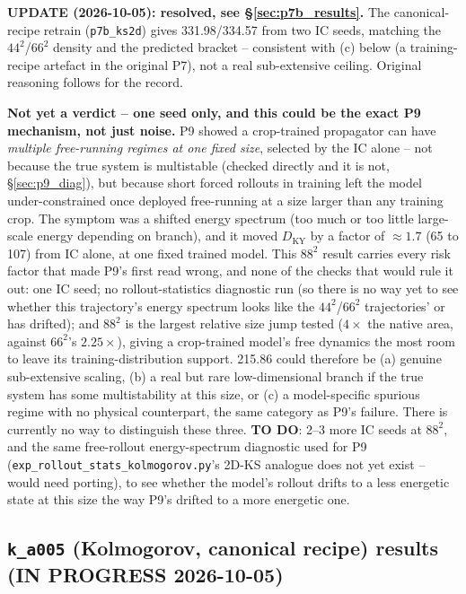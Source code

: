 \documentclass[11pt]{article}
\begin{document}
\textbf{UPDATE (2026-10-05): resolved, see \S\ref{sec:p7b_results}.} The
canonical-recipe retrain (\texttt{p7b\_ks2d}) gives 331.98/334.57 from
two IC seeds, matching the $44^2$/$66^2$ density and the predicted
bracket -- consistent with (c) below (a training-recipe artefact in the
original P7), not a real sub-extensive ceiling. Original reasoning
follows for the record.

\textbf{Not yet a verdict -- one seed only, and this could be the exact
P9 mechanism, not just noise.} P9 showed a crop-trained propagator can
have \emph{multiple free-running regimes at one fixed size}, selected
by the IC alone -- not because the true system is multistable (checked
directly and it is not, \S\ref{sec:p9_diag}), but because short forced
rollouts in training left the model under-constrained once deployed
free-running at a size larger than any training crop. The symptom was a
shifted energy spectrum (too much or too little large-scale energy
depending on branch), and it moved $D_{\mathrm{KY}}$ by a factor of
$\approx1.7$ (65 to 107) from IC alone, at one fixed trained model. This
$88^2$ result carries every risk factor that made P9's first read
wrong, and none of the checks that would rule it out: one IC seed; no
rollout-statistics diagnostic run (so there is no way yet to see
whether this trajectory's energy spectrum looks like the
$44^2$/$66^2$ trajectories' or has drifted); and $88^2$ is the largest
relative size jump tested ($4\times$ the native area, against
$66^2$'s $2.25\times$), giving a crop-trained model's free dynamics the
most room to leave its training-distribution support. 215.86 could
therefore be (a) genuine sub-extensive scaling, (b) a real but rare
low-dimensional branch if the true system has some multistability at
this size, or (c) a model-specific spurious regime with no physical
counterpart, the same category as P9's failure. There is currently no
way to distinguish these three. \textbf{TO DO}: 2--3 more IC seeds at
$88^2$, and the same free-rollout energy-spectrum diagnostic used for
P9 (\texttt{exp\_rollout\_stats\_kolmogorov.py}'s
2D-KS analogue does not yet exist -- would need porting), to see
whether the model's rollout drifts to a less energetic state at this
size the way P9's drifted to a more energetic one.



\subsection{\texttt{k\_a005} (Kolmogorov, canonical recipe) results
(IN PROGRESS 2026-10-05)}
\label{sec:k_a005_results}
\end{document}
